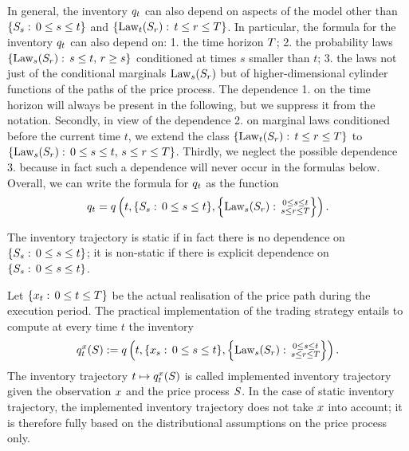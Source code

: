 \documentclass[10pt,a4paper]{article}
\begin{document}
	In general, the inventory $q_t$ can also  depend on aspects of the model other than  $\lbrace S_s:\, 0\leq s\leq t\rbrace$ and $\lbrace \text{Law}_t (S_r): \, t\leq r\leq T\rbrace$. In particular, the formula for the inventory  $q_t$ can  also depend  on: 1. the time horizon $T$; 2. the probability laws $\lbrace \text{Law}_s (S_r): \, s\leq t, \,  r\geq s\rbrace$ conditioned at times $s$ smaller than $t$; 3. the laws not just of the conditional marginals $\text{Law}_s (S_r)$ but  of  higher-dimensional cylinder functions of the paths of the price process. The dependence 1. on the time horizon will always be present in the following, but we suppress it from the notation. Secondly,  in view of the dependence 2. on marginal laws conditioned before the current time $t$, we extend the class 	$\lbrace \text{Law}_t (S_r): \, t\leq r\leq T\rbrace$ to	$\lbrace \text{Law}_s (S_r): \, 0\leq s\leq t, \, s\leq r\leq T\rbrace$. Thirdly,  we neglect the possible dependence 3. because in fact such a dependence will never occur in the formulas below. Overall, we can write the formula for  $q_t$  as the function 
	\begin{equation}	\label{eq.inventoryAsFunctionOfPriceProcess}
	q_t = q \left(  t, \lbrace S_s:\, 0\leq s\leq t\rbrace, \left\lbrace \text{Law}_s (S_r): \, \substack{0\leq s \leq t \\s\leq r\leq T}\right \rbrace \right).
	\end{equation}
	
	The inventory trajectory is static if in fact there is no dependence on  $\lbrace S_s:\, 0\leq s\leq t\rbrace$; it is non-static if there is explicit dependence on  $\lbrace S_s:\, 0\leq s\leq t\rbrace$.
	
	Let $\lbrace x_t : \, 0\leq t\leq T \rbrace$ be the actual realisation of the price path during the execution period. The practical implementation of the trading strategy entails to compute at every time $t$ the inventory 
	\begin{equation}\label{eq.implementedInventory}
	q^{x}_t (S) 
	:= q\left(t,
			\lbrace x_s : \, 0\leq s\leq t \rbrace,
			\left\lbrace \text{Law}_s (S_r): \, \substack{0\leq s \leq t \\s\leq r\leq T} \right\rbrace
			\right).
	\end{equation}
	The inventory trajectory $t\mapsto q^{x}_t(S)$ is called implemented inventory trajectory given the observation $x$ and the price process $S$. In the case of static inventory trajectory, the implemented inventory trajectory does not take $x$ into account; it is therefore fully based on the distributional assumptions on the price process only. 
	
\end{document}
